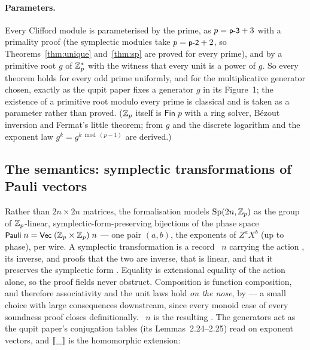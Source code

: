 \paragraph{Parameters.}  Every Clifford module is
parameterised by the prime, as $p = \mbox{\textsf{\small p-3}} + 3$ with a primality
proof (the symplectic modules take $p = \mbox{\textsf{\small p-2}} + 2$, so
Theorems~\ref{thm:unique} and~\ref{thm:sp} are proved for every prime),
and by a primitive root $g$ of $\mathbb{Z}_p^{*}$ with the witness 
that every unit is a power of $g$.  So every theorem holds for every odd
prime uniformly, and for the multiplicative generator chosen, exactly as
the qupit paper fixes a generator $g$ in its Figure~1; the existence of
a primitive root modulo every prime is classical and is taken as a
parameter rather than proved.  ($\mathbb{Z}_p$ itself is $\mathsf{Fin}\;p$ with
a ring solver, B\'ezout inversion and Fermat's little theorem; from $g$
and  the discrete logarithm and the exponent law $g^{k} =
g^{k \bmod (p-1)}$ are derived.)

\subsection{The semantics: symplectic transformations of Pauli vectors}\label{sec:spsem}

Rather than $2n \times 2n$ matrices, the formalisation models $\mathrm{Sp}(2n,\mathbb{Z}_p)$ as
the group of $\mathbb{Z}_p$-linear, symplectic-form-preserving bijections of the
phase space $\mbox{\textsf{\small Pauli}}\;n = \mbox{\textsf{\small Vec}}\;(\mathbb{Z}_p \times \mathbb{Z}_p)\;n$ --- one
pair $(a,b)$, the exponents of $Z^{a}X^{b}$ (up to phase), per wire.
A symplectic transformation is a record ~$n$ carrying
the action , its inverse, and proofs that the two are inverse,
that  is linear, and that it preserves the symplectic form
.  Equality is extensional equality of the action alone, so
the proof fields never obstruct.  Composition is function composition,
and therefore associativity and the unit laws hold \emph{on the nose},
by  --- a small choice with large consequences downstream,
since every monoid case of every soundness proof closes definitionally.
~$n$ is the resulting .  The generators act
as the qupit paper's conjugation tables (its Lemmas~2.24--2.25) read on
exponent vectors, and $[\![\_]\!]$ is the homomorphic extension:

